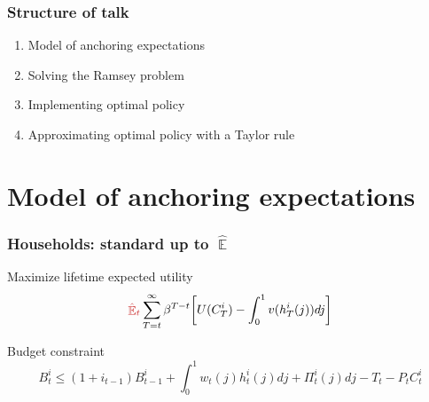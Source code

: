 \documentclass[10pt]{beamer}
\DeclareMathOperator{\E}{\mathbb{E}}
\begin{document}
\begin{frame}
	\frametitle{Structure of talk}

\setlength{\leftmargini}{12pt}
\begin{enumerate}
\item \hspace{-0.15cm} Model of anchoring expectations

\vspace{0.75cm}

\item \hspace{-0.15cm} Solving the Ramsey problem

\vspace{0.75cm}

\item \hspace{-0.15cm} Implementing optimal policy

\vspace{0.75cm}

\item \hspace{-0.15cm} Approximating optimal policy with a Taylor rule



\end{enumerate}


\end{frame}

\section{Model of anchoring expectations}

\begin{frame}
	\frametitle{Households: standard up to $\hat{\E}$}
	\label{HH}

Maximize lifetime expected utility
\begin{equation}
\textcolor{brownreddark}{\hat{\E}_t}\sum^{\infty}_{T=t}\beta^{T-t} \bigg[ U(C^i_T) - \int_0^1 v(h^i_T(j)) dj \bigg]
\label{lifetime_U}
\end{equation}	

Budget constraint
\begin{equation}
 B^i_t \leq (1+i_{t-1})B^i_{t-1} + \int_0^1 w_t(j)h^i_t(j) dj + \Pi_t^i(j)  dj-T_t -P_tC^i_t
 \label{BC}
\end{equation}



\vfill

\hfill \hyperlink{details_HHs_firms}{}
\end{frame}
\end{document}
